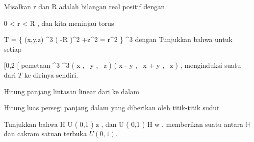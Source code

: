 {}
{

Misalkan
\mathkor {} {r} {dan} {R} {}
adalah bilangan real positif dengan

\mavergleichskette
{\vergleichskette
{ 0
}
{ < }{ r
}
{ < }{ R
}
{    }{
}
{   }{
}
}
{}{}{,}
dan kita meninjau torus
 {} {}

\mavergleichskettedisp
{\vergleichskette
{ T
}
{ =} { \left\{ (x,y,z) \in \R^3  \mid   \left(   -R  \right)^2 +z^2  = r^2         \right\}
}
{ \subseteq} { \R^3
}
{ } {
}
{ } {
}
}
{}{}{}
dengan
Tunjukkan bahwa untuk setiap

\mavergleichskette
{\vergleichskette
{ \alpha
}
{ \in }{ [0,2 \pi [
}
{  }{
}
{    }{
}
{   }{
}
}
{}{}{}
pemetaan
\maabbeledisp {\Psi_\alpha} {\R^3} {\R^3
} { \left(  x   , \,   y  , \,  z                 \right) } { \left(  x \cos \alpha - y \sin  \alpha   , \,   x \sin \alpha + y \cos  \alpha  , \,  z                 \right)
} {,}
menginduksi suatu
dari $T$ ke dirinya sendiri.

}
{} {}

{}
{

Hitung panjang lintasan linear dari
 ke
 dalam

}
{} {}

{}
{

Hitung luas persegi panjang dalam
yang diberikan oleh titik-titik sudut

}
{} {}

{}
{

Tunjukkan bahwa
\maabbeledisp {\varphi} { {\mathbb H} } { U \left(  0,1  \right)
} { z} { {  }
} {,}
dan
\maabbeledisp {\psi} {  U \left(  0,1  \right)  } { {\mathbb H}
} {w} { {  }
} {,}
memberikan suatu
antara
${\mathbb H}$ dan cakram satuan terbuka $U \left(  0,1  \right)$.

}
{} {}

